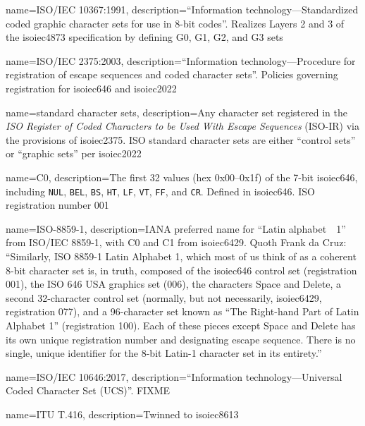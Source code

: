 {
  name={ISO/IEC 10367:1991},
  description={``Information technology---Standardized coded graphic character sets for use in 8-bit codes''.
    Realizes Layers 2 and 3 of the \Gls{isoiec4873} specification by defining
    G0, G1, G2, and G3 sets}
}

{
  name={ISO/IEC 2375:2003},
  description={``Information technology---Procedure for registration of escape sequences and coded character sets''.
   Policies governing registration for \Gls{isoiec646} and \Gls{isoiec2022}}
}

{
  name={standard character sets},
  description={Any character set registered in the \textit{ISO Register of Coded
               Characters to be Used With Escape Sequences} (ISO-IR) via the
             provisions of \Gls{isoiec2375}. ISO standard character sets are
             either ``control sets'' or ``graphic sets'' per \Gls{isoiec2022}}
}

{
  name={C0},
  description={The first 32 values (hex 0x00--0x1f) of the 7-bit
    \Gls{isoiec646}, including \texttt{NUL}, \texttt{BEL}, \texttt{BS},
    \texttt{HT}, \texttt{LF}, \texttt{VT}, \texttt{FF}, and \texttt{CR}.
    Defined in \Gls{isoiec646}. ISO registration number 001}
}

{
  name={ISO-8859-1},
  description={IANA preferred name for ``Latin alphabet~\textnumero\ 1'' from ISO/IEC 8859-1,
    with \Gls{C0} and C1 from \Gls{isoiec6429}. Quoth Frank da Cruz:
    ``Similarly, ISO 8859-1 Latin Alphabet 1, which most of us think of as a
    coherent 8-bit character set is, in truth, composed of the \Gls{isoiec646}
    control set (registration 001), the ISO 646 USA graphics set (006), the
    characters Space and Delete, a second 32-character control set (normally,
    but not necessarily, \Gls{isoiec6429}, registration 077), and a 96-character set
    known as ``The Right-hand Part of Latin Alphabet 1'' (registration 100). Each of
    these pieces except Space and Delete has its own unique registration number
    and designating escape sequence. There is no single, unique identifier for
    the 8-bit Latin-1 character set in its entirety\cite{interchange}.''
  }
}

{
  name={ISO/IEC 10646:2017},
  description={``Information technology---Universal Coded Character Set (UCS)''.
    FIXME
    }
}

{
  name={ITU T.416},
  description={Twinned to \Gls{isoiec8613}}
}

